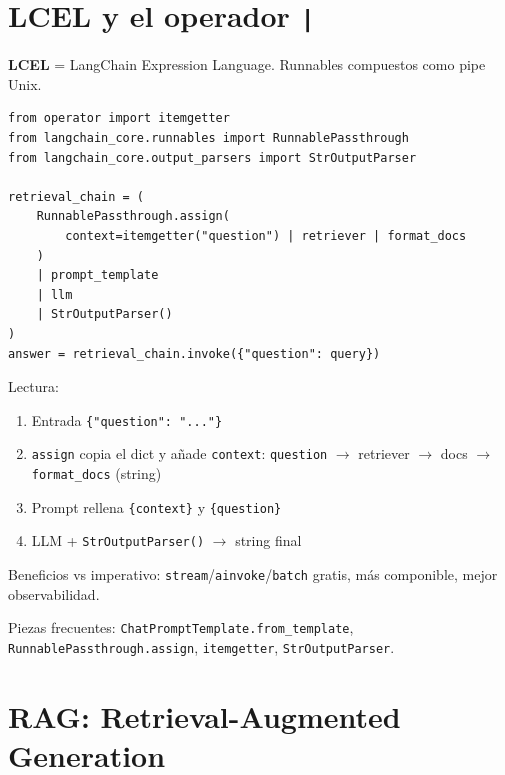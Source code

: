 \documentclass[11pt,a4paper]{article}
\begin{document}
\section{LCEL y el operador \texttt{|}}

\textbf{LCEL} = LangChain Expression Language. Runnables compuestos como pipe Unix.

\begin{fromcode}[title=04-rag/main.py]
\begin{lstlisting}
from operator import itemgetter
from langchain_core.runnables import RunnablePassthrough
from langchain_core.output_parsers import StrOutputParser

retrieval_chain = (
    RunnablePassthrough.assign(
        context=itemgetter("question") | retriever | format_docs
    )
    | prompt_template
    | llm
    | StrOutputParser()
)
answer = retrieval_chain.invoke({"question": query})
\end{lstlisting}
\end{fromcode}

Lectura:
\begin{enumerate}[leftmargin=*,itemsep=1pt]
  \item Entrada \texttt{\{"question": "..."\}}
  \item \texttt{assign} copia el dict y añade \texttt{context}:
        \texttt{question} $\to$ retriever $\to$ docs $\to$ \texttt{format\_docs} (string)
  \item Prompt rellena \texttt{\{context\}} y \texttt{\{question\}}
  \item LLM + \texttt{StrOutputParser()} $\to$ string final
\end{enumerate}

Beneficios vs imperativo: \texttt{stream}/\texttt{ainvoke}/\texttt{batch} gratis, más componible, mejor observabilidad.

Piezas frecuentes: \texttt{ChatPromptTemplate.from\_template}, \texttt{RunnablePassthrough.assign}, \texttt{itemgetter}, \texttt{StrOutputParser}.

\section{RAG: Retrieval-Augmented Generation}
\end{document}
